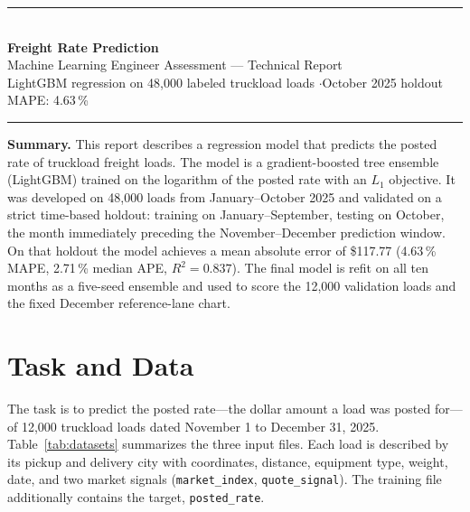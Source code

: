 \documentclass[11pt]{article}
\newcommand{\code}[1]{\texttt{#1}}
\begin{document}
\begin{center}
    {\color{accent}\rule{\textwidth}{1.6pt}}\\[14pt]
    {\LARGE\bfseries\color{accent} Freight Rate Prediction}\\[6pt]
    {\large Machine Learning Engineer Assessment --- Technical Report}\\[10pt]
    {\small\color{muted} LightGBM regression on 48{,}000 labeled truckload loads
    \quad$\cdot$\quad October 2025 holdout MAPE: 4.63\,\%}\\[10pt]
    {\color{accent}\rule{\textwidth}{1.6pt}}
\end{center}

\vspace{4pt}
\begin{center}
\begin{minipage}{0.92\textwidth}
\small
\textbf{\color{accent}Summary.}\quad
This report describes a regression model that predicts the posted rate of
truckload freight loads. The model is a gradient-boosted tree ensemble
(LightGBM) trained on the logarithm of the posted rate with an
$L_1$ objective. It was developed on 48{,}000 loads from January--October
2025 and validated on a strict time-based holdout: training on
January--September, testing on October, the month immediately preceding the
November--December prediction window. On that holdout the model achieves a
mean absolute error of \$117.77 (4.63\,\% MAPE, 2.71\,\% median APE,
$R^2 = 0.837$). The final model is refit on all ten months as a five-seed
ensemble and used to score the 12{,}000 validation loads and the fixed
December reference-lane chart.
\end{minipage}
\end{center}

\section{Task and Data}

The task is to predict the posted rate---the dollar amount a load was posted
for---of 12{,}000 truckload loads dated November 1 to December 31, 2025.
Table~\ref{tab:datasets} summarizes the three input files. Each load is
described by its pickup and delivery city with coordinates, distance,
equipment type, weight, date, and two market signals
(\code{market\_index}, \code{quote\_signal}). The training file additionally
contains the target, \code{posted\_rate}.
\end{document}
